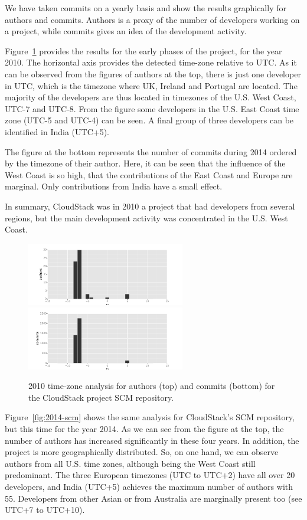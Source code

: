 \documentclass{sig-alternate-05-2015}
\begin{document}
We have taken commits on a 
yearly basis and show the results graphically for authors and commits.
Authors is a proxy of the number of developers working on a project, while
commits gives an idea of the development activity.

Figure~\ref{fig:2010-scm} provides the results for the early phases of the
project, for the year 2010. The horizontal axis provides the detected time-zone
relative to UTC. As it can be observed from the figures of authors at the top, there is just one developer in UTC, which is the timezone where UK, Ireland 
and Portugal are located. The majority of the developers are
thus located in timezones of the U.S. West Coast, UTC-7 and UTC-8. From the
figure some developers in the U.S. East Coast time zone (UTC-5 and UTC-4)
can be seen. A final group of three developers can be identified in India
(UTC+5).

The figure at the bottom represents the number of commits during 2014 ordered
by the timezone of their author. Here, it can be seen that the influence of the
West Coast is so high, that the contributions of the East Coast and Europe
are marginal. Only contributions from India have a small effect.

In summary, CloudStack was in 2010 a project that had developers from several
regions, but the main development activity was concentrated in the U.S. West
Coast.

\begin{figure}[!h]
\centering
\includegraphics[width=6.9cm]{figs/cloudstack/tz-scm-authors-2010.pdf}
\includegraphics[width=6.9cm]{figs/cloudstack/tz-scm-commits-2010.pdf}
\caption{2010 time-zone analysis for authors (top) and commits (bottom) for
the CloudStack project SCM repository.}
\label{fig:2010-scm}
\end{figure}

Figure~\ref{fig:2014-scm} shows the same analysis for CloudStack's SCM
repository, but this time for the year 2014. As we can see
from the figure at the top, the number of authors has increased significantly
in these four years. In addition, the project is more geographically distributed.
So, on one hand, we can observe authors from all U.S. time zones, although
being the West Coast still predominant. The three European timezones (UTC to UTC+2)
have all over 20 developers, and India (UTC+5) achieves the maximum number
of authors with 55. Developers from other Asian or from Australia are marginally
present too (see UTC+7 to UTC+10).
\end{document}
